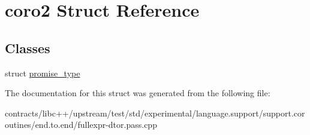 \hypertarget{structcoro2}{}\section{coro2 Struct Reference}
\label{structcoro2}
\subsection*{Classes}
\begin{DoxyCompactItemize}
\item 
struct \mbox{\hyperlink{structcoro2_1_1promise__type}{promise\+\_\+type}}
\end{DoxyCompactItemize}


The documentation for this struct was generated from the following file\+:\begin{DoxyCompactItemize}
\item 
contracts/libc++/upstream/test/std/experimental/language.\+support/support.\+coroutines/end.\+to.\+end/fullexpr-\/dtor.\+pass.\+cpp\end{DoxyCompactItemize}
